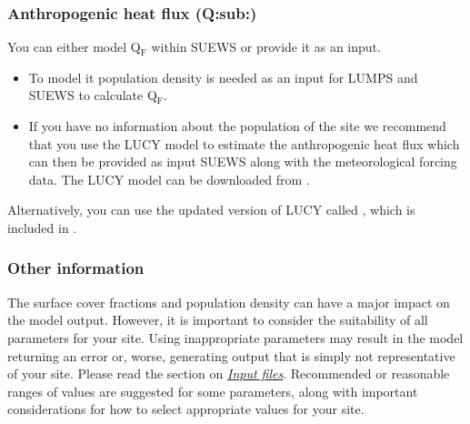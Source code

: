 \documentclass[letterpaper,10pt,english]{sphinxmanual}
\begin{document}
\subsubsection{Anthropogenic heat flux (Q:sub:)}
\label{\detokenize{prepare-to-run-the-model:anthropogenic-heat-flux-qf-1}}\label{\detokenize{prepare-to-run-the-model:anthropogenic-heat-flux-q-sub-f}}
You can either model Q$_{\text{F}}$ within SUEWS or provide it as an input.
\begin{itemize}
\item {} 
To model it population density is needed as an input for LUMPS and
SUEWS to calculate Q$_{\text{F}}$.

\item {} 
If you have no information about the population of the site we
recommend that you use the LUCY model \label{\detokenize{prepare-to-run-the-model:id7}}{\hyperref[\detokenize{references:lucy}]{\sphinxcrossref{{[}lucy{]}}}}  \label{\detokenize{prepare-to-run-the-model:id8}}{\hyperref[\detokenize{references:lucy2}]{\sphinxcrossref{{[}lucy2{]}}}} to estimate the
anthropogenic heat flux which can then be provided as input SUEWS
along with the meteorological forcing data. The LUCY model can be
downloaded from .

\end{itemize}

Alternatively, you can use the updated version of LUCY called
, which is included in
.


\subsubsection{Other information}
\label{\detokenize{prepare-to-run-the-model:other-information}}
The surface cover fractions and population density can have a major
impact on the model output. However, it is important to consider the
suitability of all parameters for your site. Using inappropriate
parameters may result in the model returning an error or, worse,
generating output that is simply not representative of your site. Please
read the section on {\hyperref[\detokenize{prepare-to-run-the-model:Input_files}]{\emph{Input files}}}. Recommended or
reasonable ranges of values are suggested for some parameters, along
with important considerations for how to select appropriate values for
your site.
\end{document}
